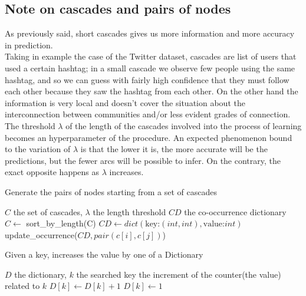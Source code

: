 \documentclass{article}
\begin{document}
			\subsection{Note on cascades and pairs of nodes}
			As previously said, short cascades gives us more information and more accuracy in prediction.\\
			Taking in example the case of the Twitter dataset, cascades are list of users that used a certain hashtag; in a small cascade we observe few people using the same hashtag, and so we can guess with fairly high confidence that they must follow each other because they saw the hashtag from each other. On the other hand the information is very local and doesn't cover the situation about the interconnection between communities and/or less evident grades of connection.\medskip\\
			The threshold $\lambda$ of the length of the cascades involved into the process of learning becomes an hyperparameter of the procedure. An expected phenomenon bound to the variation of $\lambda$ is that the lower it is, the more accurate will be the predictions, but the fewer arcs will be possible to infer. On the contrary, the exact opposite happens as $\lambda$ increases.
			
			\begin{algorithm}[H] %
				\caption{Generate the pairs of nodes starting from a set of cascades} %
				\label{alg1} %
				\begin{algorithmic} %
					\REQUIRE $C$ the set of cascades, $\lambda$ the length threshold
					\ENSURE $CD$ the co-occurrence dictionary
					\STATE $C \gets$ sort\_by\_length(C)
					\STATE $CD \gets dict(\text{key:} (int,int), \text{value:} int)$
								\STATE update\_occurrence($CD,pair(c[i],c[j])$)
							\ENDFOR
						\ENDFOR
					\ENDFOR
				\end{algorithmic}
			\end{algorithm}
			
			\begin{algorithm}[H] %
				\caption{Given a key, increases the value by one of a Dictionary} %
				\label{alg2} %
				\begin{algorithmic} %
					\REQUIRE $D$ the dictionary, $k$ the searched key
					\ENSURE the increment of the counter(the value) related to $k$
						\STATE $D[k] \gets D[k]+1$
					\ELSE
						\STATE $D[k] \gets 1$
					\ENDIF
				\end{algorithmic}
			\end{algorithm}
			
\end{document}
